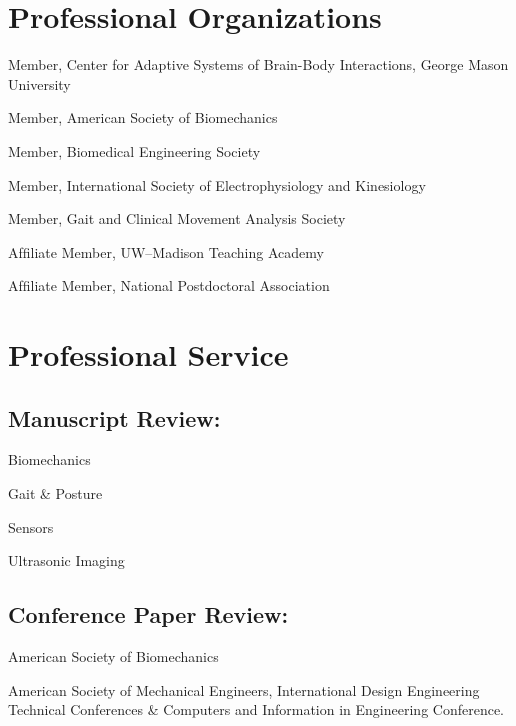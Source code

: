 \documentclass[letterpaper, 10pt]{article}
\begin{document}
\section{Professional Organizations}

\begin{compacthang}
     \item Member, Center for Adaptive Systems of Brain-Body Interactions, George Mason University
     \item Member, American Society of Biomechanics
     \item Member, Biomedical Engineering Society
     \item Member, International Society of Electrophysiology and Kinesiology
     \item Member, Gait and Clinical Movement Analysis Society
     \item Afﬁliate Member, UW--Madison Teaching Academy 
     \item Afﬁliate Member, National Postdoctoral Association
\end{compacthang}

\section{Professional Service}

\subsection{Manuscript Review:}
\setlength{\hangingleftmargin}{2.5em}
\setlength{\hangingindent}{2em}
\begin{compacthang}
    \item Biomechanics
    \item Gait \& Posture
    \item Sensors
    \item Ultrasonic Imaging
\end{compacthang}

\subsection{Conference Paper Review:}
\begin{hanginglist} %
    \item American Society of Biomechanics
    \item American Society of Mechanical Engineers, International Design Engineering Technical Conferences \& Computers and Information in Engineering Conference.
\end{hanginglist} %
\end{document}
